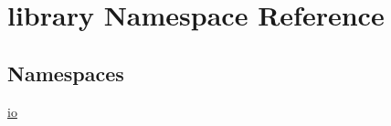 \hypertarget{namespacelibrary}{}\section{library Namespace Reference}
\label{namespacelibrary}
\subsection*{Namespaces}
\begin{DoxyCompactItemize}
\item 
 \hyperlink{namespacelibrary_1_1io}{io}
\end{DoxyCompactItemize}

